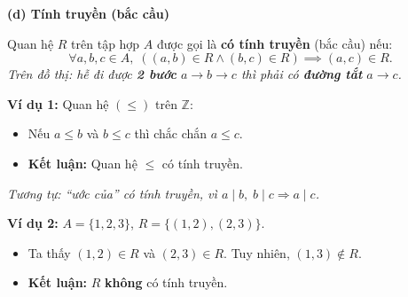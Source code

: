 \documentclass[12pt,a4paper]{article}
\begin{document}
\vspace{6pt}
\textbf{(d) Tính truyền (bắc cầu)}

Quan hệ $R$ trên tập hợp $A$ được gọi là \textbf{có tính truyền} (bắc cầu) nếu:
\[
  \forall a, b, c \in A,\; ((a, b) \in R \land (b, c) \in R) \implies (a, c) \in R.
\]
\textit{Trên đồ thị: hễ đi được \textbf{2 bước} $a \to b \to c$ thì phải có \textbf{đường tắt} $a \to c$.}

\noindent
\begin{minipage}[t]{0.47\textwidth}
\textbf{\textcolor{AccentRed}{Ví dụ 1:}} Quan hệ $(\le)$ trên $\mathbb{Z}$:
\begin{itemize}
  \item Nếu $a \le b$ và $b \le c$ thì chắc chắn $a \le c$.
  \item \textbf{Kết luận:} Quan hệ $\le$ có tính truyền.
\end{itemize}
\textit{Tương tự: ``ước của'' có tính truyền, vì $a \mid b,\; b \mid c \Rightarrow a \mid c$.}
\end{minipage}
\hfill
\begin{minipage}[t]{0.49\textwidth}
\textbf{\textcolor{AccentRed}{Ví dụ 2:}} $A = \{1, 2, 3\}$, $R = \{(1, 2), (2, 3)\}$.
\begin{itemize}
  \item Ta thấy $(1, 2) \in R$ và $(2, 3) \in R$. Tuy nhiên, $(1, 3) \notin R$.
  \item \textbf{Kết luận:} $R$ \textbf{không} có tính truyền.
\end{itemize}
\begin{center}
\end{center}
\end{minipage}
\end{document}
